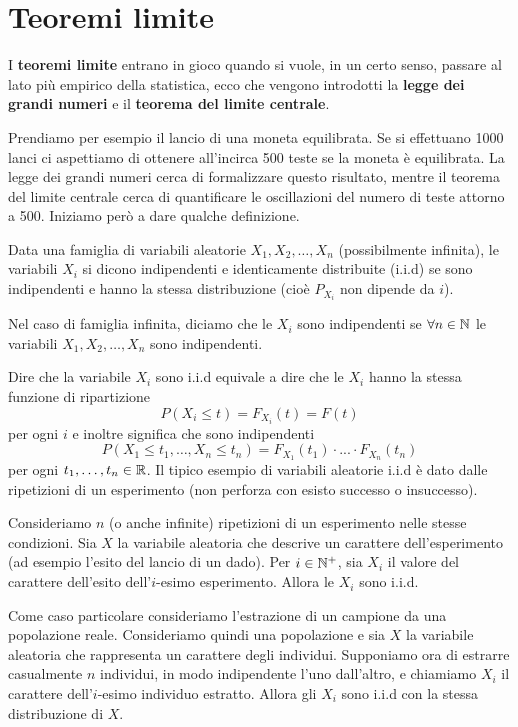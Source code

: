 \section{Teoremi limite}
I \textbf{teoremi limite} entrano in gioco quando si vuole, in un certo senso, passare al lato
più empirico della statistica, ecco che vengono introdotti la \textbf{legge dei grandi numeri} e
il \textbf{teorema del limite centrale}.

Prendiamo per esempio il lancio di una moneta equilibrata. Se si effettuano 1000 lanci ci
aspettiamo di ottenere all'incirca 500 teste se la moneta è equilibrata. La legge dei grandi numeri
cerca di formalizzare questo risultato, mentre il teorema del limite centrale cerca di quantificare
le oscillazioni del numero di teste attorno a 500. Iniziamo però a dare qualche definizione.

\begin{definition}
	Data una famiglia di variabili aleatorie $X_1, X_2, \dots, X_n$ (possibilmente infinita), le
	variabili $X_i$ si dicono indipendenti e identicamente distribuite (i.i.d) se sono indipendenti
	e hanno la stessa distribuzione (cioè $P_{X_i}$ non dipende da $i$).

	Nel caso di famiglia infinita, diciamo che le $X_i$ sono indipendenti se $\forall n \in \mathbb{N}$ le
	variabili $X_1, X_2, \dots, X_n$ sono indipendenti.
\end{definition}

Dire che la variabile $X_i$ sono i.i.d equivale a dire che le $X_i$ hanno la stessa funzione di
ripartizione
\[ P(X_i \leq t) = F_{X_i} (t) = F(t) \]
per ogni $i$ e inoltre significa che sono indipendenti
\[ P(X_1 \leq t_1, \dots, X_n \leq t_n) = F_{X_1} (t_1) \cdot ... \cdot F_{X_n} (t_n) \]
per ogni $t_1, \dots, t_n \in \mathbb{R}$. Il tipico esempio di variabili aleatorie i.i.d è dato dalle
ripetizioni di un esperimento (non perforza con esisto successo o insuccesso).

Consideriamo $n$ (o anche infinite) ripetizioni di un esperimento nelle stesse condizioni. Sia
$X$ la variabile aleatoria che descrive un carattere dell'esperimento (ad esempio l'esito del
lancio di un dado). Per $i \in \mathbb{N}^+$, sia $X_i$ il valore del carattere dell'esito dell'$i$-esimo
esperimento. Allora le $X_i$ sono i.i.d.

Come caso particolare consideriamo l'estrazione di un campione da una popolazione reale.
Consideriamo quindi una popolazione e sia $X$ la variabile aleatoria che rappresenta un carattere
degli individui. Supponiamo ora di estrarre casualmente $n$ individui, in modo indipendente l'uno
dall'altro, e chiamiamo $X_i$ il carattere dell'$i$-esimo individuo estratto. Allora gli $X_i$
sono i.i.d con la stessa distribuzione di $X$.


